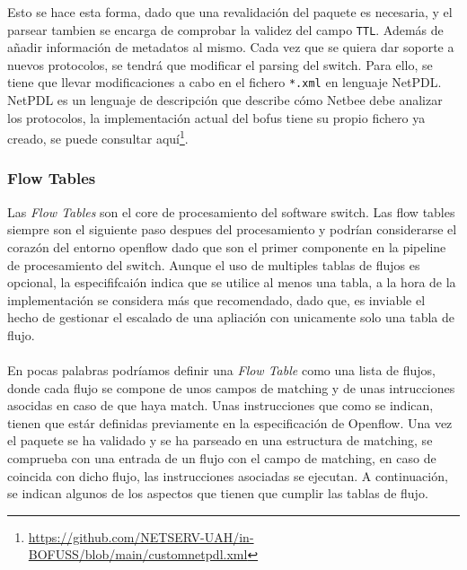 Esto se hace esta forma, dado que una revalidación del paquete es necesaria, y el parsear tambien se encarga de comprobar la validez del campo \texttt{TTL}. Además de añadir información de metadatos al mismo. Cada vez que se quiera dar soporte a nuevos protocolos, se tendrá que modificar el parsing del switch. Para ello, se tiene que llevar modificaciones a cabo en el fichero \texttt{*.xml} en lenguaje NetPDL. NetPDL es un lenguaje de descripción que describe cómo Netbee debe analizar los protocolos, la implementación actual del \gls{bofus} tiene su propio fichero ya creado, se puede consultar aquí\footnote{\url{https://github.com/NETSERV-UAH/in-BOFUSS/blob/main/customnetpdl.xml}}.


\subsubsection{Flow Tables}

Las \textit{Flow Tables} son el core de procesamiento del software switch. Las flow tables siempre son el siguiente paso despues del procesamiento y podrían considerarse el corazón del entorno openflow dado que son el primer componente en la pipeline de procesamiento del switch. Aunque el uso de multiples tablas de flujos es opcional, la especififcaión indica que se utilice al menos una tabla, a la hora de la implementación se considera más que recomendado, dado que, es inviable el hecho de gestionar el escalado de una apliación con unicamente solo una tabla de flujo. \\
\\
En pocas palabras podríamos definir una  \textit{Flow Table} como una lista de flujos, donde cada flujo se compone de unos campos de matching y de unas intrucciones asocidas en caso de que haya match. Unas instrucciones que como se indican, tienen que estár definidas previamente en la especificación de Openflow. Una vez el paquete se ha validado y se ha parseado en una estructura de matching, se comprueba con una entrada de un flujo con el campo de matching, en caso de coincida con dicho flujo, las instrucciones asociadas se ejecutan. A continuación, se indican algunos de los aspectos que tienen que cumplir las tablas de flujo.

